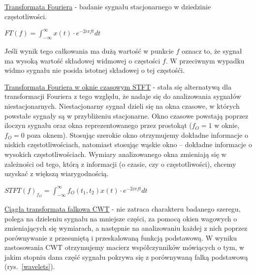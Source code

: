 \underline{Transformata Fouriera} - badanie sygnału stacjonarnego w dziedzinie częstotliwości.

$ FT(f) = \int_{-\infty}^{\infty} x(t) \cdot e^{-2i\pi f t} dt $

Jeśli wynik tego całkowania ma dużą wartość w punkcie $ f $ oznacz to, że sygnał ma wysoką wartość składowej widmowej o częstości $ f $. W przeciwnym wypadku widmo sygnału nie posida istotnej składowej o tej częstośći.

\underline{Transformata Fouriera w oknie czasowym STFT} - stała się alternatywą dla
transformacji Fouriera z tego względu, że 
nadaje się do analizowania sygnałów niestacjonarnych. Niestacjonarny sygnał dzieli się na okna czasowe, w których powstałe sygnały są w przybliżeniu stacjonarne. Okno czasowe powstają poprzez iloczyn sygnału oraz okna reprezentowanego przez prostokąt ($ f_O = 1 $ w oknie, $ f_O = 0 $ poza oknem). Stosując szerokie okno otrzymujemy dokładne informacje o niskich częstotliwościach, natomiast stosując wąskie okno – dokładne informacje o wysokich częstotliwościach. Wymiary analizowanego okna zmieniają się w zależności od tego, którą
z informacji (o czasie, czy o częstotliwości), chcemy uzyskać z większą
wiarygodnością.

$ STFT(f)_{f_O} = \int_{-\infty}^{\infty} f_O(t_1, t_2) x(t) \cdot e^{-2i\pi f t} dt $

\underline{Ciągła transformata falkowa CWT} - nie zatraca charakteru badanego szeregu, polega na dzieleniu sygnału na mniejsze części, za
pomocą okien wagowych o zmieniających się wymiarach, a następnie na analizowaniu
każdej z nich poprzez porównywanie z przesuniętą i przeskalowaną funkcją podstawową. W wyniku zastosowania CWT otrzymujemy macierz współczynników
mówiących o tym, w jakim stopniu dana część sygnału pokrywa się z porównywaną falką podstawową (rys.~\ref{wavelets}).

